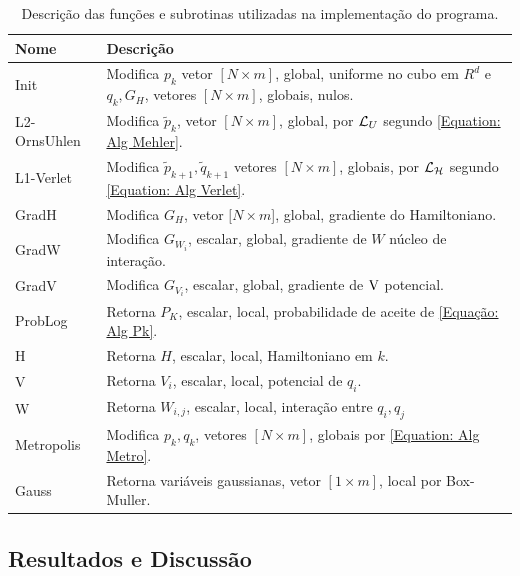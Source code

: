 \documentclass[12pt]{report}
\begin{document}
\begin{table}[ht]
	\centering
	\begin{tabular}{ |p{2.6cm}||p{12cm}|  }
		\hline
		Nome & Descrição \\ 
		\hline
		\hline
		Init   		  	 & 
		Modifica ${p}_{k}$ vetor $[N\times m]$, global, uniforme no cubo em $R^d$ e ${q}_{k}, G_H$, vetores $[N\times m]$, globais, nulos. \\
		\hline
		L2-OrnsUhlen 	 & 
		Modifica $\tilde{p}_k$, vetor $[N\times m]$, global, por $\operatorname{\mathcal{L}}_U$ segundo \eqref{Equation: Alg Mehler}. \\
		\hline
		L1-Verlet  	 	 & 
		Modifica $\tilde{p}_{k+1},\tilde{q}_{k+1}$ vetores $[N\times m]$, globais, por $\operatorname{\mathcal{L}}_{\operatorname{\mathcal{H}}}$ segundo \eqref{Equation: Alg Verlet}.	\\
		\hline
		GradH         	 & 
		Modifica $G_H$, vetor $[N\times m$], global, gradiente do Hamiltoniano.					\\
		\hline
		GradW        	 &
		Modifica $G_{W_i}$, escalar, global, gradiente de $W$ núcleo de interação.	\\
		\hline
		GradV  	      	 &
		Modifica $G_{V_i}$, escalar, global, gradiente de $\operatorname{V}$ potencial.		                    \\
		\hline
		ProbLog       		 &
		Retorna $P_K$, escalar, local, probabilidade de aceite de \eqref{Equação: Alg Pk}. \\
		\hline
		H              	 &
		Retorna $H$, escalar, local, Hamiltoniano em $k$.	 							\\
		\hline
		V  	      			 &
		Retorna $V_i$, escalar, local, potencial de $q_i$.								\\
		\hline
		W         	  		 & 
		Retorna $W_{i,j}$, escalar, local, interação entre $q_i,q_j$ 							\\
		\hline
		Metropolis     	 & 
		Modifica ${p}_{k},{q}_{k}$, vetores $[N\times m]$, globais por \eqref{Equation: Alg Metro}.								\\
		\hline
		Gauss     	 & 
		Retorna variáveis gaussianas, vetor $[1\times m]$, local por Box-Muller.								\\
		\hline
	\end{tabular}
	\caption{ Descrição das funções e subrotinas utilizadas na implementação do programa.}
	\label{Table: Funcoes e Subrotinas}
\end{table}

\subsection{Resultados e Discussão}
\end{document}
